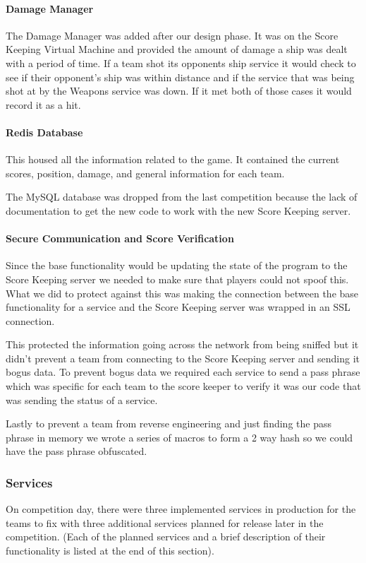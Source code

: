 \documentclass[10pt]{article}
\begin{document}
\paragraph*{Damage Manager}
The Damage Manager was added after our design phase. It was on the Score Keeping Virtual
Machine and provided the amount of damage a ship was dealt with a period of time.
If a team shot its opponents ship service it would check to see if their opponent's ship was 
within distance and if the service that was being shot at by the Weapons service was down.
If it met both of those cases it would record it as a hit.

\paragraph*{Redis Database}
This housed all the information related to the game. It contained the current
scores, position, damage, and general information for each team.

The MySQL database was dropped from the last competition because the lack of documentation 
to get the new code to work with the new Score Keeping server.

\paragraph*{Secure Communication and Score Verification}
Since the base functionality would be updating the state of the program to the Score Keeping
server we needed to make sure that players could not spoof this. What we did to protect
against this was making the connection between the base functionality for a service
and the Score Keeping server was wrapped in an SSL connection. 

This protected the information going across the network from being sniffed but it 
didn't prevent a team from connecting to the Score Keeping server and sending it bogus 
data. To prevent bogus data we required each service to send a pass phrase which was specific
for each team to the score keeper to verify it was our code that was sending the 
status of a service.

Lastly to prevent a team from reverse engineering and just finding the pass phrase in
memory we wrote a series of macros to form a 2 way hash so we could have the pass phrase
obfuscated.

\subsubsection{Services}
\label{stservices}
On competition day, there were three implemented services in production for the
teams to fix with three additional services planned for release later in the
competition. (Each of the planned services and a brief description of their
functionality is listed at the end of this section).
\end{document}
